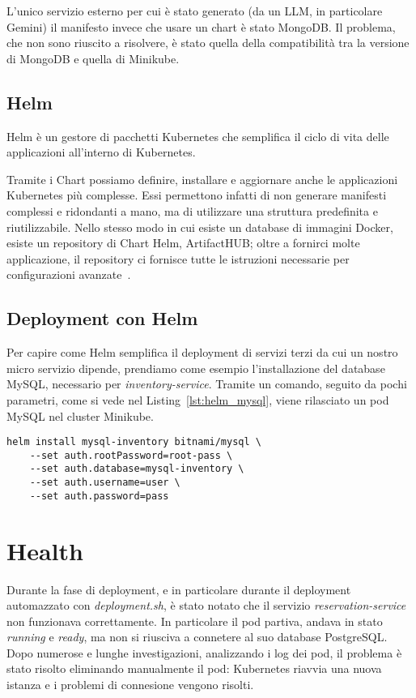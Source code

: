 \myskip

L'unico servizio esterno per cui è stato generato (da un LLM, in particolare Gemini) il manifesto invece che usare un chart è stato MongoDB. Il problema, che non sono riuscito a risolvere, è stato quella della compatibilità tra la versione di MongoDB e quella di Minikube.

\subsection{Helm}
Helm è un gestore di pacchetti Kubernetes che semplifica il ciclo di vita delle applicazioni all'interno di Kubernetes.

Tramite i Chart possiamo definire, installare e aggiornare anche le applicazioni Kubernetes più complesse. Essi permettono infatti di non generare manifesti complessi e ridondanti a mano, ma di utilizzare una struttura predefinita e riutilizzabile. Nello stesso modo in cui esiste un database di immagini Docker, esiste un repository di Chart Helm, ArtifactHUB; oltre a fornirci molte applicazione, il repository ci fornisce tutte le istruzioni necessarie per configurazioni avanzate~\cite{artifacthub_mysql}.

\subsection{Deployment con Helm}
Per capire come Helm semplifica il deployment di servizi terzi da cui un nostro micro servizio dipende, prendiamo come esempio l'installazione del database MySQL, necessario per \textit{inventory-service}. Tramite un comando, seguito da pochi parametri, come si vede nel Listing~\ref{lst:helm_mysql}, viene rilasciato un pod MySQL nel cluster Minikube.
\begin{lstlisting}[caption=MySQL Helm chart, label=lst:helm_mysql]
helm install mysql-inventory bitnami/mysql \
    --set auth.rootPassword=root-pass \
    --set auth.database=mysql-inventory \
    --set auth.username=user \
    --set auth.password=pass
\end{lstlisting}

\section{Health}
Durante la fase di deployment, e in particolare durante il deployment automazzato con \textit{deployment.sh}, è stato notato che il servizio \textit{reservation-service} non funzionava correttamente. In particolare il pod partiva, andava in stato \textit{running} e \textit{ready}, ma non si riusciva a connetere al suo database PostgreSQL. Dopo numerose e lunghe investigazioni, analizzando i log dei pod, il problema è stato risolto eliminando manualmente il pod: Kubernetes riavvia una nuova istanza e i problemi di connesione vengono risolti.

